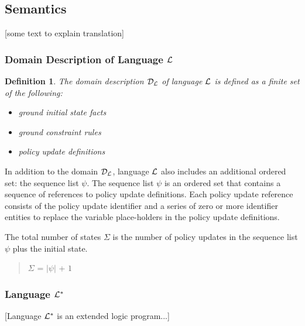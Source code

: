 \documentclass[10pt, twocolumn]{article}
\newtheorem{definition}{Definition}
\begin{document}
    \subsection{Semantics}

      [some text to explain translation]

      \subsubsection{Domain Description of Language ${\cal L}$}

        \begin{definition}
          The domain description ${\cal D}_{\cal L}$ of language ${\cal L}$ is
          defined as a finite set of the following:

          \begin{itemize}
            \item
              ground initial state facts
            \item
              ground constraint rules
            \item
              policy update definitions
          \end{itemize}
        \end{definition}

        In addition to the domain ${\cal D}_{\cal L}$, language ${\cal L}$
        also includes an additional ordered set: the sequence list $\psi$.
        The sequence list $\psi$ is an ordered set that contains a sequence of
        references to policy update definitions. Each policy update reference
        consists of the policy update identifier and a series of zero or more
        identifier entities to replace the variable place-holders in the policy
        update definitions.

        The total number of states $\Sigma$ is the number of policy updates in
        the sequence list $\psi$ plus the initial state.

        \begin{quote}
          $\Sigma$ = $|\psi|$ + $1$
        \end{quote}

      \subsubsection{Language ${\cal L}^{*}$}

        [Language ${\cal L}^{*}$ is an extended logic program...]
\end{document}
